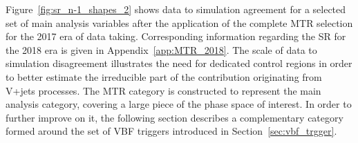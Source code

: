 \hspace{10pt} Figure~\ref{fig:sr_n-1_shapes_2} shows data to simulation agreement for a selected set of main analysis variables after the application of the complete MTR selection for the 2017 era of data taking. Corresponding information regarding the SR for the 2018 era is given in Appendix~\ref{app:MTR_2018}. The scale of data to simulation disagreement illustrates the need for dedicated control regions in order to better estimate the irreducible part of the contribution originating from V+jets processes. The MTR category is constructed to represent the main analysis category, covering a large piece of the phase space of interest. In order to further improve on it, the following section describes a complementary category formed around the set of VBF triggers introduced in Section~\ref{sec:vbf_trgger}.

